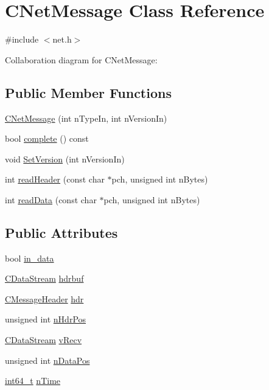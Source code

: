 \hypertarget{class_c_net_message}{}\section{C\+Net\+Message Class Reference}
\label{class_c_net_message}


{\ttfamily \#include $<$net.\+h$>$}



Collaboration diagram for C\+Net\+Message\+:
\subsection*{Public Member Functions}
\begin{DoxyCompactItemize}
\item 
\hyperlink{class_c_net_message_aa70db259a11e329ece8e9db4b895982c}{C\+Net\+Message} (int n\+Type\+In, int n\+Version\+In)
\item 
bool \hyperlink{class_c_net_message_a440150fa0e6a84699780048baca55da8}{complete} () const 
\item 
void \hyperlink{class_c_net_message_a63b9f2351d5e92126cacacd51d9e16b6}{Set\+Version} (int n\+Version\+In)
\item 
int \hyperlink{class_c_net_message_a3e58f5f29b23d1377f8fd15fc75c78ac}{read\+Header} (const char $\ast$pch, unsigned int n\+Bytes)
\item 
int \hyperlink{class_c_net_message_adbc1669a56462daea5f37e5e99117f8c}{read\+Data} (const char $\ast$pch, unsigned int n\+Bytes)
\end{DoxyCompactItemize}
\subsection*{Public Attributes}
\begin{DoxyCompactItemize}
\item 
bool \hyperlink{class_c_net_message_a8f399ad7225f980bdab3ede17b1b23af}{in\+\_\+data}
\item 
\hyperlink{class_c_data_stream}{C\+Data\+Stream} \hyperlink{class_c_net_message_a80a6f95f0c187aa97788118248cbf452}{hdrbuf}
\item 
\hyperlink{class_c_message_header}{C\+Message\+Header} \hyperlink{class_c_net_message_ae7215dca62862a3688f7eeb94646c377}{hdr}
\item 
unsigned int \hyperlink{class_c_net_message_a1a500121037490eec4b238906f3a23ad}{n\+Hdr\+Pos}
\item 
\hyperlink{class_c_data_stream}{C\+Data\+Stream} \hyperlink{class_c_net_message_a1a25c16099d01362e1663390a2e06d1a}{v\+Recv}
\item 
unsigned int \hyperlink{class_c_net_message_a418f59287d1805dda6959f27a170c855}{n\+Data\+Pos}
\item 
\hyperlink{stdint_8h_adec1df1b8b51cb32b77e5b86fff46471}{int64\+\_\+t} \hyperlink{class_c_net_message_a99d5bbca862ac4b7a88b71a7b679decc}{n\+Time}
\end{DoxyCompactItemize}



